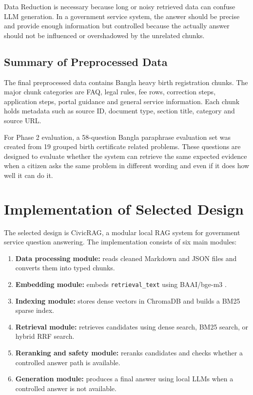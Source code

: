 Data Reduction is necessary because long or noisy retrieved data can confuse LLM generation. In a government service system, the answer should be precise and provide enough information but controlled because the actually answer should not be influenced or overshadowed by the unrelated chunks.

\subsection{Summary of Preprocessed Data}

The final preprocessed data contains Bangla heavy birth registration chunks. The major chunk categories are FAQ, legal rules, fee rows, correction steps, application steps, portal guidance and general service information. Each chunk holds metadata such as source ID, document type, section title, category and source URL.

For Phase 2 evaluation, a 58-question Bangla paraphrase evaluation set was created from 19 grouped birth certificate related problems. These questions are designed to evaluate whether the system can retrieve the same expected evidence when a citizen asks the same problem in different wording and even if it does how well it can do it.

\section{Implementation of Selected Design}

The selected design is CivicRAG, a modular local RAG system for government service question answering. The implementation consists of six main modules:

\begin{enumerate}
    \item \textbf{Data processing module:} reads cleaned Markdown and JSON files and converts them into typed chunks.
    \item \textbf{Embedding module:} embeds \texttt{retrieval\_text} using BAAI/bge-m3 \cite{chen2024bgem3}.
    \item \textbf{Indexing module:} stores dense vectors in ChromaDB and builds a BM25 sparse index.
    \item \textbf{Retrieval module:} retrieves candidates using dense search, BM25 search, or hybrid RRF search.
    \item \textbf{Reranking and safety module:} reranks candidates and checks whether a controlled answer path is available.
    \item \textbf{Generation module:} produces a final answer using local LLMs when a controlled answer is not available.
\end{enumerate}

